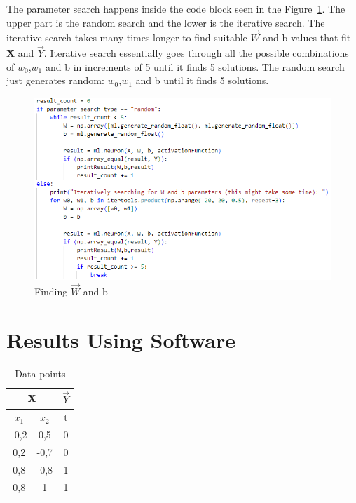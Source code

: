 \documentclass{article}
\begin{document}
        The parameter search happens inside the code block seen in the Figure~\ref{fig:param}. The upper part is the random search and the lower is the iterative search. The iterative search takes many times longer to find suitable $\vec{W}$ and b values that fit $\mathbf{X}$ and $\vec{Y}$. Iterative search essentially goes through all the possible combinations of $w_0$,$w_1$ and b in increments of 5 until it finds 5 solutions. The random search just generates random: $w_0$,$w_1$ and b until it finds 5 solutions.
        \begin{figure}[H]
            \centering
            \includegraphics[width=1\textwidth]{parameter-search.png}
            \caption{Finding $\vec{W}$ and b}
            \label{fig:param}
        \end{figure}
    \section{Results Using Software}
        \begin{table}[H]
        \centering
        \caption{Data points}
        \begin{tabular}{|c|c|c|}
        \hline
        \multicolumn{2}{|c|}{$\mathbf{X}$} & $\vec{Y}$ \\
        \hline
        $x_{1}$ & $x_{2}$ & t \\
        \hline
        -0,2 & 0,5 & 0 \\
        \hline
        0,2 & -0,7 & 0 \\
        \hline
        0,8 & -0,8 & 1 \\
        \hline
        0,8 & 1 & 1 \\
        \hline
        \end{tabular}
        \end{table}
        
\end{document}
